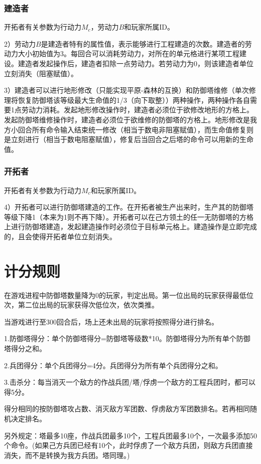 \documentclass[a4paper,4pt]{article}
\begin{document}
\subsubsection{建造者}
开拓者有关参数为行动力$M_c$，劳动力$B$和玩家所属ID。\par
2）劳动力$B$是建造者特有的属性值，表示能够进行工程建造的次数。建造者的劳动力大小初始值为3。每回合可以消耗劳动力，对所在的单元格进行某项工程建设。建造者发起操作后，建造者扣除一点劳动力。若劳动力为0，则该建造者单位立刻消失（阻塞赋值）。\par %
3）建造者可以进行地形修改（只能实现平原-森林的互换）和防御塔维修（单次修理将恢复防御塔该等级最大生命值的1/3（向下取整））两种操作，两种操作各自需要1点劳动力消耗。发起地形修改操作时，建造者必须位于欲修改地形的方格上。发起防御塔维修操作时，建造者必须位于欲维修的防御塔的方格上。地形修改是我方小回合所有命令输入结束统一修改（相当于数电非阻塞赋值），而生命值修复则是立刻进行（相当于数电阻塞赋值），修复后当回合之后塔的命令可以用新的生命值。
\subsubsection{开拓者}
开拓者有关参数为行动力$M_c$和玩家所属ID。\par
4）开拓者可以进行防御塔建造的工作。在开拓者被生产出来时，生产其的防御塔等级下降1（本来为1则不再下降）。开拓者可以在己方领土的任一无防御塔的方格上进行防御塔建造，发起建造操作时必须位于目标单元格上。建造操作是立即完成的，且会使得开拓者单位立刻消失。


\section{计分规则}
在游戏进程中防御塔数量降为0的玩家，判定出局。第一位出局的玩家获得最低位次，第二位出局的玩家获得次低位次，依次类推。\par
当游戏进行至300回合后，场上还未出局的玩家将按照得分进行排名。\par
1.防御塔得分：单个防御塔得分=防御塔等级数*10。防御塔得分为所有单个防御塔得分之和。\par
2.兵团得分：单个兵团得分=4分。兵团得分为所有单个兵团得分之和。\par
3.击杀分：每当消灭一个敌方的作战兵团/塔/俘虏一个敌方的工程兵团时，都可以得5分。\par
得分相同的按防御塔攻占数、消灭敌方军团数、俘虏敌方军团数排名。若再相同随机决定排名。\par
另外规定：塔最多10座，作战兵团最多10个，工程兵团最多10个，一次最多添加50个命令。(如果己方兵团已经有10个，此时俘虏了一个敌方兵团，则敌方兵团直接消失，而不是转换为我方兵团。塔同理。)
\end{document}
